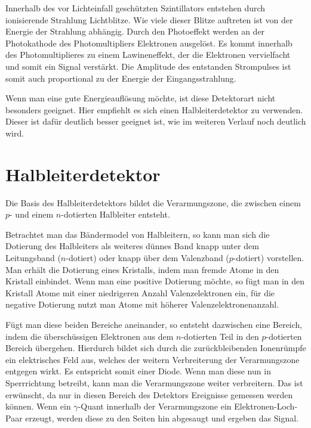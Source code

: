\documentclass[11pt, ngerman, fleqn, DIV=15, headinclude, BCOR=2cm]{scrreprt}
\begin{document}
Innerhalb des vor Lichteinfall geschützten Szintillators entstehen durch
ionisierende Strahlung Lichtblitze. 
Wie viele dieser Blitze auftreten ist von der Energie der Strahlung abhängig.
Durch den Photoeffekt werden an der Photokathode des Photomultipliers
Elektronen ausgelöst.
Es kommt innerhalb des Photomultiplieres zu einem Lawineneffekt,
der die Elektronen vervielfacht und somit ein Signal verstärkt.
Die Amplitude des entstanden Strompulses ist somit auch proportional zu der
Energie der Eingangsstrahlung.

Wenn man eine gute Energieauflösung möchte, ist diese Detektorart nicht
besonders geeignet. Hier empfiehlt es sich einen Halbleiterdetektor zu
verwenden. Dieser ist dafür deutlich besser geeignet ist, wie im weiteren Verlauf noch
deutlich wird.


\section{Halbleiterdetektor}

Die Basis des Halbleiterdetektors bildet die Verarmungszone, die zwischen einem
$p$- und einem $n$-dotierten Halbleiter entsteht.

Betrachtet man das Bändermodel von Halbleitern, so kann man sich die Dotierung
des Halbleiters als weiteres dünnes Band knapp unter dem Leitungsband
($n$-dotiert) oder knapp über dem Valenzband ($p$-dotiert) vorstellen.
Man erhält die Dotierung eines Kristalls, indem man fremde Atome in den
Kristall einbindet.
Wenn man eine positive Dotierung möchte, so fügt man in den Kristall Atome mit
einer niedrigeren Anzahl Valenzelektronen ein, für die negative Dotierung nutzt
man Atome mit höherer Valenzelektronenanzahl.

Fügt man diese beiden Bereiche aneinander, so entsteht dazwischen eine Bereich,
indem die überschüssigen Elektronen aus dem $n$-dotierten Teil in den
$p$-dotierten Bereich übergehen.
Hierdurch bildet sich durch die zurückbleibenden Ionenrümpfe ein elektrisches Feld aus, welches
der weitern Verbreiterung der Verarmungszone entgegen wirkt.
Es entspricht somit einer Diode.
Wenn man diese nun in Sperrrichtung betreibt, kann man die Verarmungszone weiter
verbreitern.
Das ist erwünscht, da nur in diesen Bereich des Detektors Ereignisse
gemessen werden können.
Wenn ein $\gamma$-Quant innerhalb der Verarmungszone  ein Elektronen-Loch-Paar
erzeugt, werden diese zu den Seiten hin abgesaugt und ergeben das Signal.
\end{document}
